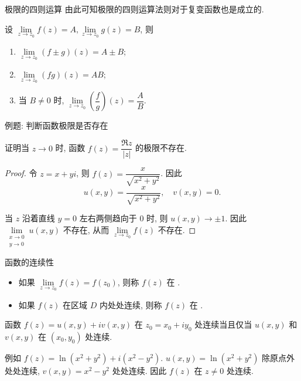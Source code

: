 \begin{frame}{极限的四则运算}
\onslide<+->
由此可知极限的四则运算法则对于复变函数也是成立的.
\begin{theorem}
设 $\lim\limits_{z\to z_0}f(z)=A,\lim\limits_{z\to z_0}g(z)=B$, 则
\begin{enumerate}
\item $\lim\limits_{z\to z_0}(f\pm g)(z)=A\pm B$;
\item $\lim\limits_{z\to z_0}(fg)(z)=AB$;
\item 当 $B\neq 0$ 时, $\lim\limits_{z\to z_0}\left(\dfrac fg\right)(z)=\dfrac AB$.
\end{enumerate}
\end{theorem}
\end{frame}


\begin{frame}{例题: 判断函数极限是否存在}
\begin{example}
证明当 $z\to0$ 时, 函数 $f(z)=\dfrac{\Re z}{|z|}$ 的极限不存在.
\end{example}
\begin{proof}
令 $z=x+yi$, 则 $f(z)=\dfrac x{\sqrt{x^2+y^2}}$.
\onslide<+->
因此
\[u(x,y)=\frac x{\sqrt{x^2+y^2}},\quad v(x,y)=0.\]

\onslide<+->
当 $z$ 沿着直线 $y=0$ 左右两侧趋向于 $0$ 时, 则 $u(x,y)\to\pm1$.
\onslide<+->
因此 $\lim\limits_{\substack{x\to 0\\y\to0}}u(x,y)$ 不存在,
\onslide<+->
从而 $\lim\limits_{z\to z_0}f(z)$ 不存在.
\end{proof}
\end{frame}


\begin{frame}{函数的连续性}
\begin{definition}
\begin{itemize}
\item 如果 $\lim\limits_{z\to z_0}f(z)=f(z_0)$, 则称 $f(z)$ 在 .
\item 如果 $f(z)$ 在区域 $D$ 内处处连续, 则称 $f(z)$ 在 .
\end{itemize}
\end{definition}

\begin{theorem}
函数 $f(z)=u(x,y)+iv(x,y)$ 在 $z_0=x_0+iy_0$ 处连续当且仅当 $u(x,y)$ 和 $v(x,y)$ 在 $(x_0,y_0)$ 处连续.
\end{theorem}

\onslide<+->
例如 $f(z)=\ln(x^2+y^2)+i(x^2-y^2)$.
\onslide<+->
$u(x,y)=\ln(x^2+y^2)$ 除原点外处处连续, $v(x,y)=x^2-y^2$ 处处连续.
\onslide<+->
因此 $f(z)$ 在 $z\neq0$ 处连续.
\end{frame}



